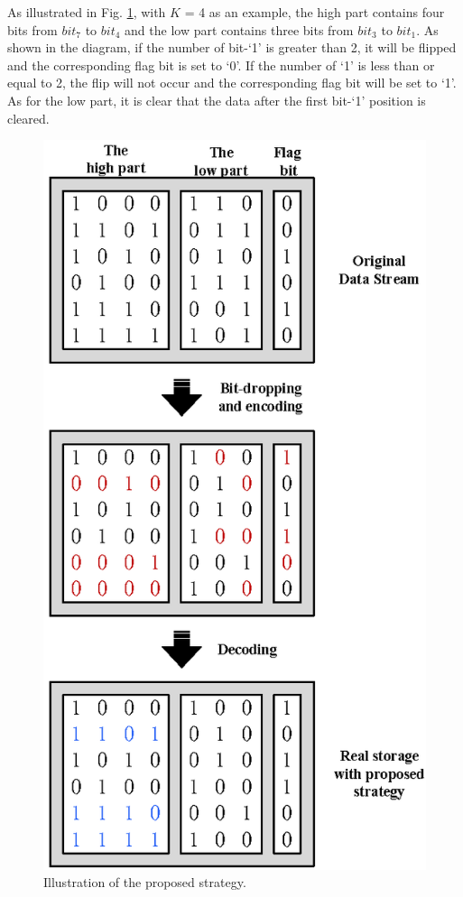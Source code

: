 \documentclass[lettersize,journal]{IEEEtran}
\begin{document}
As illustrated in Fig. \ref{fig4}, with $K$ = 4 as an example, the high part contains four bits from $bit_7$ to $bit_4$ and the low part contains three bits from $bit_3$ to $bit_1$. As shown in the diagram, if the number of bit-`1' is greater than 2, it will be flipped and the corresponding flag bit is set to `0'. If the number of `1' is less than or equal to 2, the flip will not occur and the corresponding flag bit will be set to `1'. As for the low part, it is clear that the data after the first bit-`1' position is cleared.
\begin{figure}[htb]
	\centering
	\includegraphics[width=.75\linewidth]{Fig/Illustration of the proposed strategy.png}
	\caption{Illustration of the proposed strategy.}
	\label{fig4}
\end{figure}
\end{document}
